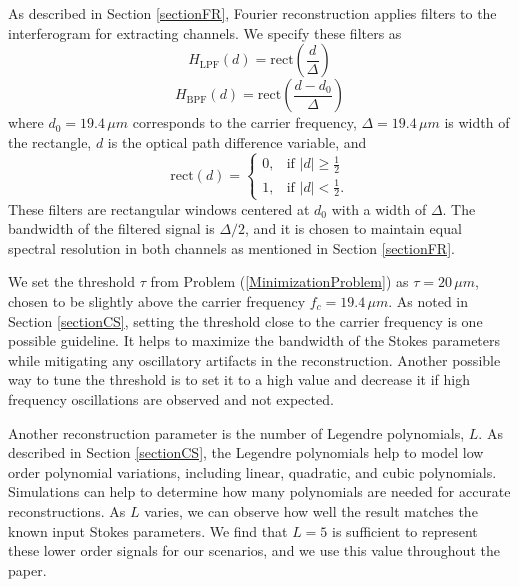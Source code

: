 \documentclass[10pt]{article}
\numberwithin{equation}{subsection}
\begin{document}
As described in Section \ref{sectionFR}, Fourier reconstruction applies filters to the interferogram for extracting channels. We specify these filters as
    \begin{equation}
        H_\text{LPF}(d) = \text{rect}\left(\frac{d}{\Delta}\right)
        \label{hlpf}
    \end{equation}
    \begin{equation}
        H_\text{BPF}(d) = \text{rect}\left(\frac{d - d_0}{\Delta}\right)
        \label{hbpf}
    \end{equation}
where $d_0 = 19.4 \, \mu m$ corresponds to the carrier frequency, $\Delta = 19.4 \, \mu m$ is width of the rectangle, $d$ is the optical path difference variable, and
%
    \begin{equation}
        \text{rect}(d) = \begin{cases}
            0, & \text{if } |d| \geq \frac{1}{2} \\
            1, & \text{if } |d| < \frac{1}{2}.
        \end{cases}
    \end{equation}
%
These filters are rectangular windows centered at $d_0$ with a width of $\Delta$.
The bandwidth of the filtered signal is $\Delta / 2$, and it is chosen to maintain equal spectral resolution in both channels as mentioned in Section \ref{sectionFR}.

 We set the threshold $\tau$ from Problem (\ref{MinimizationProblem}) as $\tau = 20 \, \mu m$, chosen to be slightly above the carrier frequency $f_c = 19.4 \, \mu m$.
 As noted in Section \ref{sectionCS}, setting the threshold close to the carrier frequency is one possible guideline.
 It helps to maximize the bandwidth of the Stokes parameters while mitigating any oscillatory artifacts in the reconstruction.
 Another possible way to tune the threshold is to set it to a high value and decrease it if high frequency oscillations are observed and not expected.

 Another reconstruction parameter is the number of Legendre polynomials, $L$.
 As described in Section \ref{sectionCS}, the Legendre polynomials help to model low order polynomial variations, including linear, quadratic, and cubic polynomials.
 Simulations can help to determine how many polynomials are needed for accurate reconstructions.
 As $L$ varies, we can observe how well the result matches the known input Stokes parameters.
 We find that $L = 5$ is sufficient to represent these lower order signals for our scenarios, and we use this value throughout the paper.
\end{document}
